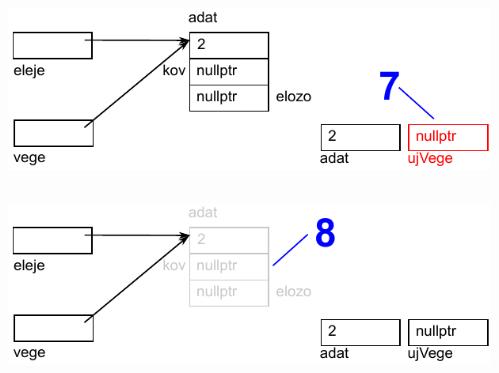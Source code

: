 \begin{frame}
  \begin{columns}[c]
      \scriptsize
      \begin{exampleblock}{}
        \scriptsize
        
      \end{exampleblock}
      \includegraphics[width=\textwidth]{sor/sor26.pdf}
  \end{columns}
\end{frame}

\begin{frame}
  \begin{columns}[c]
      \scriptsize
      \begin{exampleblock}{}
        \scriptsize
        
      \end{exampleblock}
      \includegraphics[width=\textwidth]{sor/sor27.pdf}
  \end{columns}
\end{frame}

